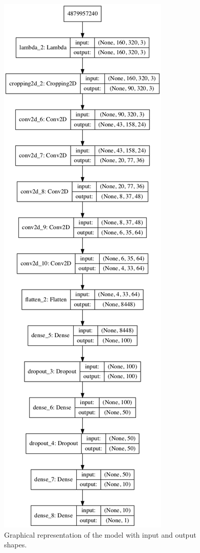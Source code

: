 \documentclass{article}
\begin{document}
\begin{figure}
\centering
\includegraphics[scale=0.3]{model.png}
\caption{Graphical representation of the model with input and output shapes.}
\label{fig:model}
\end{figure}
\end{document}
